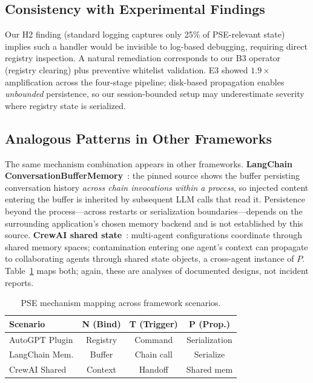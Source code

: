 \documentclass{article}
\theoremstyle{plain}
\theoremstyle{definition}
\newcommand{\pse}{\textsc{PSE}}
\begin{document}
\subsection{Consistency with Experimental Findings}

Our H2 finding (standard logging captures only 25\% of \pse{}-relevant state) implies such a handler would be invisible to log-based debugging, requiring direct registry inspection. A natural remediation corresponds to our B3 operator (registry clearing) plus preventive whitelist validation. E3 showed $1.9\times$ amplification across the four-stage pipeline; disk-based propagation enables \emph{unbounded} persistence, so our session-bounded setup may underestimate severity where registry state is serialized.

\subsection{Analogous Patterns in Other Frameworks}

The same mechanism combination appears in other frameworks. \textbf{LangChain ConversationBufferMemory}~\cite{langchain2023,langchainmemory2023}: the pinned source shows the buffer persisting conversation history \emph{across chain invocations within a process}, so injected content entering the buffer is inherited by subsequent LLM calls that read it. Persistence beyond the process---across restarts or serialization boundaries---depends on the surrounding application's chosen memory backend and is not established by this source. \textbf{CrewAI shared state}~\cite{crewai2024,crewaimemory2024}: multi-agent configurations coordinate through shared memory spaces; contamination entering one agent's context can propagate to collaborating agents through shared state objects, a cross-agent instance of $P$. Table~\ref{tab:incidents} maps both; again, these are analyses of documented designs, not incident reports.

\begin{table}[!htbp]
\centering
\footnotesize
\begin{tabular}{@{}lccc@{}}
\toprule
\textbf{Scenario} & \textbf{N (Bind)} & \textbf{T (Trigger)} & \textbf{P (Prop.)} \\
\midrule
AutoGPT Plugin & Registry & Command & Serialization \\
LangChain Mem. & Buffer & Chain call & Serialize \\
CrewAI Shared & Context & Handoff & Shared mem \\
\bottomrule
\end{tabular}
\caption{PSE mechanism mapping across framework scenarios.}
\label{tab:incidents}
\end{table}
\end{document}
